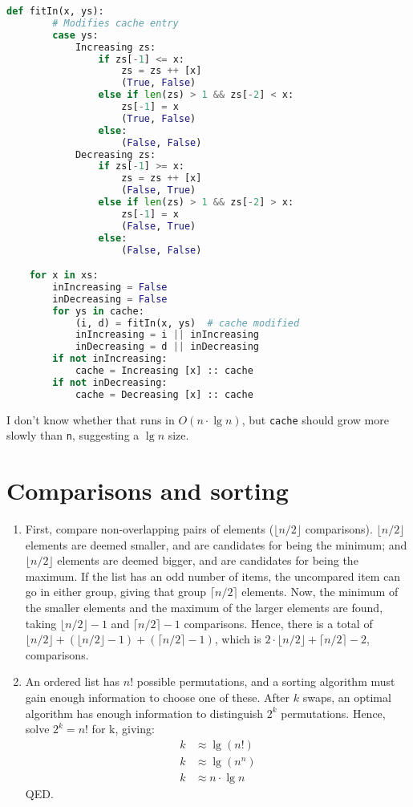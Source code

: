 \documentclass[11pt]{article}
\begin{document}
\begin{enumerate}
\begin{minipage}[t]{\linewidth}
\begin{lstlisting}[language=python]
    def fitIn(x, ys):
        # Modifies cache entry
        case ys:
            Increasing zs:
                if zs[-1] <= x:
                    zs = zs ++ [x]
                    (True, False)
                else if len(zs) > 1 && zs[-2] < x:
                    zs[-1] = x
                    (True, False)
                else:
                    (False, False)
            Decreasing zs:
                if zs[-1] >= x:
                    zs = zs ++ [x]
                    (False, True)
                else if len(zs) > 1 && zs[-2] > x:
                    zs[-1] = x
                    (False, True)
                else:
                    (False, False)

    for x in xs:
        inIncreasing = False
        inDecreasing = False
        for ys in cache:
            (i, d) = fitIn(x, ys)  # cache modified
            inIncreasing = i || inIncreasing
            inDecreasing = d || inDecreasing
        if not inIncreasing:
            cache = Increasing [x] :: cache
        if not inDecreasing:
            cache = Decreasing [x] :: cache
\end{lstlisting}
\end{minipage}
I don't know whether that runs in \(O(n\cdot\lg n)\), but \texttt{cache} should grow more slowly than \texttt{n}, suggesting a \(\lg n\) size.
\end{enumerate}

\section{Comparisons and sorting}
\begin{enumerate}
\item First, compare non-overlapping pairs of elements (\(\lfloor n/2 \rfloor\) comparisons). \(\lfloor n/2 \rfloor\) elements are deemed smaller, and are candidates for being the minimum; and \(\lfloor n/2 \rfloor\) elements are deemed bigger, and are candidates for being the maximum. If the list has an odd number of items, the uncompared item can go in either group, giving that group \(\lceil n/2 \rceil\) elements. Now, the minimum of the smaller elements and the maximum of the larger elements are found, taking \(\lfloor n/2 \rfloor - 1\) and \(\lceil n/2 \rceil - 1\) comparisons. Hence, there is a total of \(\lfloor n/2 \rfloor + (\lfloor n/2 \rfloor - 1) + (\lceil n/2 \rceil - 1)\), which is \(2\cdot\lfloor n/2 \rfloor + \lceil n/2 \rceil - 2\), comparisons.
\item An ordered list has \(n!\) possible permutations, and a sorting algorithm must gain enough information to choose one of these. After \(k\) swaps, an optimal algorithm has enough information to distinguish \(2^k\) permutations. Hence, solve \(2^k=n!\) for k, giving:
\[\begin{aligned}
k&\approx\lg(n!) \\
k&\approx\lg(n^n) \\
k&\approx n\cdot\lg n
\end{aligned}\]
QED.
\end{enumerate}
\end{document}
